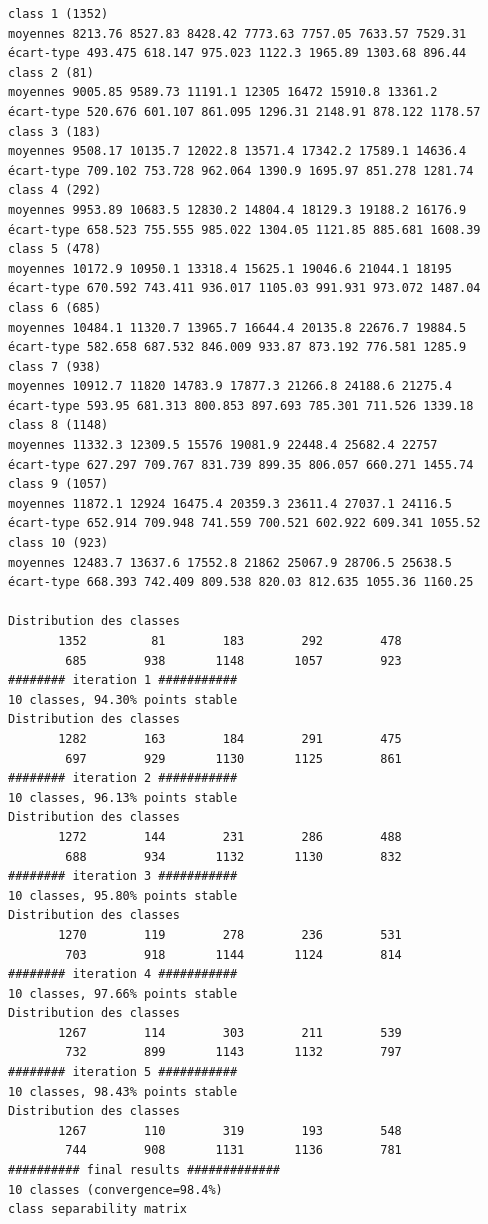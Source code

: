 \documentclass[land,article,submit,pdftex,moreauthors]{Definitions/mdpi}
\begin{document}
\begin{scriptsize}
\begin{verbatim}
class 1 (1352)
moyennes 8213.76 8527.83 8428.42 7773.63 7757.05 7633.57 7529.31
écart-type 493.475 618.147 975.023 1122.3 1965.89 1303.68 896.44
class 2 (81)
moyennes 9005.85 9589.73 11191.1 12305 16472 15910.8 13361.2
écart-type 520.676 601.107 861.095 1296.31 2148.91 878.122 1178.57
class 3 (183)
moyennes 9508.17 10135.7 12022.8 13571.4 17342.2 17589.1 14636.4
écart-type 709.102 753.728 962.064 1390.9 1695.97 851.278 1281.74
class 4 (292)
moyennes 9953.89 10683.5 12830.2 14804.4 18129.3 19188.2 16176.9
écart-type 658.523 755.555 985.022 1304.05 1121.85 885.681 1608.39
class 5 (478)
moyennes 10172.9 10950.1 13318.4 15625.1 19046.6 21044.1 18195
écart-type 670.592 743.411 936.017 1105.03 991.931 973.072 1487.04
class 6 (685)
moyennes 10484.1 11320.7 13965.7 16644.4 20135.8 22676.7 19884.5
écart-type 582.658 687.532 846.009 933.87 873.192 776.581 1285.9
class 7 (938)
moyennes 10912.7 11820 14783.9 17877.3 21266.8 24188.6 21275.4
écart-type 593.95 681.313 800.853 897.693 785.301 711.526 1339.18
class 8 (1148)
moyennes 11332.3 12309.5 15576 19081.9 22448.4 25682.4 22757
écart-type 627.297 709.767 831.739 899.35 806.057 660.271 1455.74
class 9 (1057)
moyennes 11872.1 12924 16475.4 20359.3 23611.4 27037.1 24116.5
écart-type 652.914 709.948 741.559 700.521 602.922 609.341 1055.52
class 10 (923)
moyennes 12483.7 13637.6 17552.8 21862 25067.9 28706.5 25638.5
écart-type 668.393 742.409 809.538 820.03 812.635 1055.36 1160.25

Distribution des classes
       1352         81        183        292        478
        685        938       1148       1057        923
######## iteration 1 ###########
10 classes, 94.30% points stable
Distribution des classes
       1282        163        184        291        475
        697        929       1130       1125        861
######## iteration 2 ###########
10 classes, 96.13% points stable
Distribution des classes
       1272        144        231        286        488
        688        934       1132       1130        832
######## iteration 3 ###########
10 classes, 95.80% points stable
Distribution des classes
       1270        119        278        236        531
        703        918       1144       1124        814
######## iteration 4 ###########
10 classes, 97.66% points stable
Distribution des classes
       1267        114        303        211        539
        732        899       1143       1132        797
######## iteration 5 ###########
10 classes, 98.43% points stable
Distribution des classes
       1267        110        319        193        548
        744        908       1131       1136        781
########## final results #############
10 classes (convergence=98.4%)
class separability matrix


\end{verbatim}
\end{scriptsize}
\end{document}
